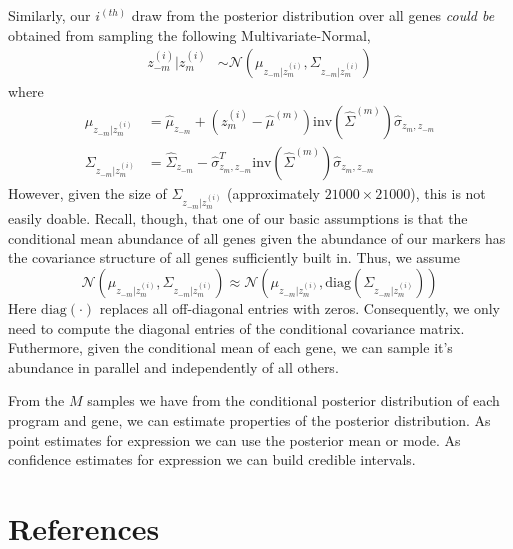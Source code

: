 \documentclass[10pt]{article}
\begin{document}
Similarly, our $i^{(th)}$ draw from the posterior distribution over all genes \emph{could be} obtained from sampling the following Multivariate-Normal,
\begin{align*}
z_{-m}^{(i)}|z^{(i)}_m & \sim \mathcal{N}\left(\mu_{z_{-m}| z_{m}^{(i)}}, \Sigma_{z_{-m}| z_{m}^{(i)}}  \right) 
\end{align*}
where
\begin{align*}
\mu_{z_{-m}| z_{m}^{(i)}}  &= \hat{\mu}_{z_{-m}} + \left(z_m^{(i)}  - \hat{\mu}^{(m)} \right)\textrm{inv}\left( \hat{\Sigma}^{(m)} \right)\hat{\sigma}_{z_{m},z_{-m}} \\
\Sigma_{z_{-m}| z_{m}^{(i)}} & = \hat{\Sigma}_{z_{-m}} -  \hat{\sigma}_{z_{m},z_{-m}}^T  \textrm{inv}\left( \hat{\Sigma}^{(m)} \right) \hat{\sigma}_{z_{m},z_{-m}}
\end{align*}
However, given the size of $\Sigma_{z_{-m}| z_{m}^{(i)}}$ (approximately $21000 \times 21000$), this is not easily doable. Recall, though, that one of our basic assumptions is that the conditional mean abundance of all genes given the abundance of our markers has the covariance structure of all genes sufficiently built in. Thus, we assume 
\[
\mathcal{N}\left(\mu_{z_{-m}| z_{m}^{(i)}}, \Sigma_{z_{-m}| z_{m}^{(i)}}  \right) \approx \mathcal{N}\left(\mu_{z_{-m}| z_{m}^{(i)}}, \textrm{diag}\left(\Sigma_{z_{-m}| z_{m}^{(i)}} \right) \right)
\]
Here $\textrm{diag}(\cdot)$ replaces all off-diagonal entries with zeros. Consequently, we only need to compute the diagonal entries of the conditional covariance matrix.  Futhermore, given the conditional mean of each gene, we can sample it's abundance in parallel and independently of all others.

From the $M$ samples we have from the conditional posterior distribution of each program and gene, we can estimate properties of the posterior distribution. As point estimates for expression we can use the posterior mean or mode. As confidence estimates for expression we can build credible intervals.  




\section{References}

\end{document}
